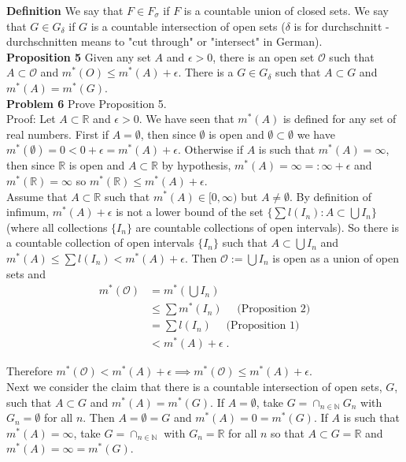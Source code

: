 \documentclass[a4paper]{article}
\begin{document}
{\bf Definition} We say that $F \in F_\sigma$ if $F$ is a countable union of closed sets. We say that $G \in G_\delta$ if $G$ is a countable intersection of open sets ($\delta$ is for durchschnitt - durchschnitten means to "cut through" or "intersect" in German).\\ 

{\bf Proposition 5} Given any set $A$ and $\epsilon > 0$, there is an open set $\mathcal{O}$ such that $A\subset \mathcal{O}$ and $m^*(O) \leq m^*(A) + \epsilon$. There is a $G \in G_\delta$ such that $A \subset G$ and $m^*(A) = m^*(G)$. \\

{\bf Problem 6} Prove Proposition 5.\\

Proof: Let $A\subset \mathbb{R}$ and $\epsilon > 0$. We have seen that $m^*(A)$ is defined for any set of real numbers. First if $A = \emptyset$, then since $\emptyset$ is open and $\emptyset \subset \emptyset$ we have $m^*(\emptyset) = 0 < 0 + \epsilon = m^*(A) + \epsilon$. Otherwise if $A$ is such that $m^*(A) = \infty$, then since $\mathbb{R}$ is open and $A \subset \mathbb{R}$ by hypothesis, $m^*(A) = \infty =: \infty + \epsilon$ and $m^*(\mathbb{R})  = \infty$ so $m^*(\mathbb{R}) \leq m^*(A) + \epsilon$.\\

Assume that $A \subset \mathbb{R}$ such that $m^*(A) \in [0,\infty)$ but $A \neq \emptyset$. By definition of infimum, $m^*(A) + \epsilon$ is not a lower bound of the set $\{\sum l(I_n) : A \subset \bigcup I_n\}$ (where all collections $\{I_n\}$ are countable collections of open intervals). So there is a countable collection of open intervals $\{I_n\}$ such that $A \subset \bigcup I_n$ and $m^*(A) \leq \sum l(I_n) < m^*(A) + \epsilon$. Then $\mathcal{O} := \bigcup I_n$ is open as a union of open sets and 
\begin{align*}
m^*(\mathcal{O}) &= m^*\left(\bigcup I_n\right) \\
&\leq \sum m^*(I_n) \quad \text{ (Proposition 2)}\\
&= \sum l(I_n) \quad \text{ (Proposition 1)}\\
&< m^*(A) +\epsilon \;.
\end{align*}

Therefore $m^*(\mathcal{O}) < m^*(A) + \epsilon \implies
m^*(\mathcal{O}) \leq m^*(A) + \epsilon$.\\

Next we consider the claim that there is a countable intersection of open sets, $G$, such that $A \subset G$ and $m^*(A) = m^*(G)$. If $A = \emptyset$, take $G = \cap_{n \in \mathbb{N}} G_n$ with $G_n = \emptyset$ for all $n$. Then $A = \emptyset = G$ and $m^*(A) = 0 = m^*(G)$. If $A$ is such that $m^*(A) = \infty$, take $G = \cap_{n \in \mathbb{N}}$ with $G_n = \mathbb{R}$ for all $n$ so that $A \subset G = \mathbb{R}$ and $m^*(A) = \infty = m^*(G)$. \\
\end{document}
